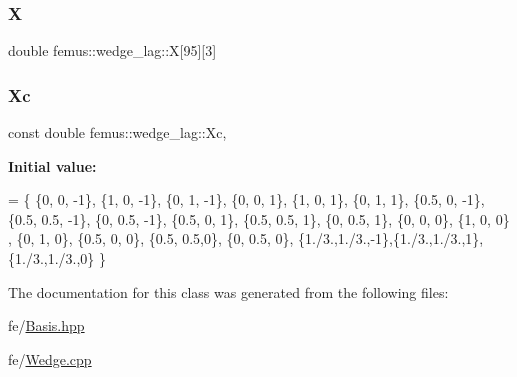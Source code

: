 \subsubsection{\texorpdfstring{X}{X}}
{\footnotesize\ttfamily double femus\+::wedge\+\_\+lag\+::X\mbox{[}95\mbox{]}\mbox{[}3\mbox{]}\hspace{0.3cm}{\ttfamily [protected]}}

\mbox{\label{classfemus_1_1wedge__lag_a9423bba603878185de0ca70185455561}} 
\subsubsection{\texorpdfstring{Xc}{Xc}}
{\footnotesize\ttfamily const double femus\+::wedge\+\_\+lag\+::\+Xc\hspace{0.3cm}{\ttfamily [static]}, {\ttfamily [protected]}}

{\bfseries Initial value\+:}
\begin{DoxyCode}
= \{
    \{0, 0, -1\},      \{1, 0, -1\},      \{0, 1, -1\},                     
    \{0, 0, 1\},       \{1, 0, 1\},       \{0, 1, 1\}, 
    \{0.5, 0, -1\},    \{0.5, 0.5, -1\},  \{0, 0.5, -1\},                   
    \{0.5, 0, 1\},     \{0.5, 0.5, 1\},   \{0, 0.5, 1\},
    \{0, 0, 0\},       \{1, 0, 0\} ,      \{0, 1, 0\},                      
    \{0.5, 0, 0\},     \{0.5, 0.5,0\},    \{0, 0.5, 0\},  
    \{1./3.,1./3.,-1\},\{1./3.,1./3.,1\}, \{1./3.,1./3.,0\} 
  \}
\end{DoxyCode}


The documentation for this class was generated from the following files\+:\begin{DoxyCompactItemize}
\item 
fe/\mbox{\hyperlink{_basis_8hpp}{Basis.\+hpp}}\item 
fe/\mbox{\hyperlink{_wedge_8cpp}{Wedge.\+cpp}}\end{DoxyCompactItemize}
